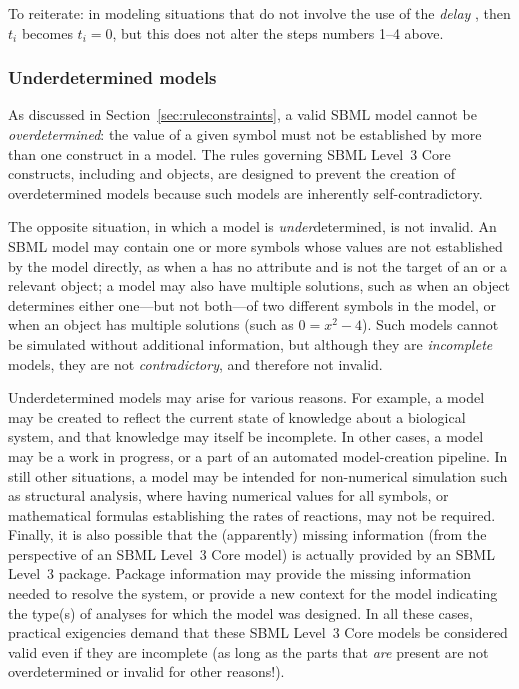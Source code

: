 To reiterate: in modeling situations that do not involve the use
of the \emph{delay} , then $t_i$ becomes $t_i = 0$,
but this does not alter the steps numbers 1--4 above.

\begin{blockChanged}
\subsubsection{Underdetermined models}
\label{sec:underdetermined}

As discussed in Section~\ref{sec:ruleconstraints}, a valid SBML model cannot be \emph{overdetermined}: the value of a given symbol must not be established by more than one construct in a model.  The rules governing SBML Level~3 Core constructs, including \InitialAssignment and \Rule objects, are designed to prevent the creation of overdetermined models because such models are inherently self-contradictory.

The opposite situation, in which a model is \emph{under}determined, is not invalid.  An SBML model may contain one or more symbols whose values are not established by the model directly, as when a \Parameter has no  attribute and is not the target of an \InitialAssignment or a relevant \Rule object; a model may also have multiple solutions, such as when an \AlgebraicRule object determines either one---but not both---of two different symbols in the model, or when an \AlgebraicRule object has multiple solutions (such as $0=x^2-4$).  Such models cannot be simulated without additional information, but although they are \emph{incomplete} models, they are not \emph{contradictory}, and therefore not invalid.

Underdetermined models may arise for various reasons.  For example, a model may be created to reflect the current state of knowledge about a biological system, and that knowledge may itself be incomplete.  In other cases, a model may be a work in progress, or a part of an automated model-creation pipeline.  In still other situations, a model may be intended for non-numerical simulation such as structural analysis, where having numerical values for all symbols, or mathematical formulas establishing the rates of reactions, may not be required.  Finally, it is also possible that the (apparently) missing information (from the perspective of an SBML Level~3 Core model) is actually provided by an SBML Level~3 package.  Package information may provide the missing information needed to resolve the system, or provide a new context for the model indicating the type(s) of analyses for which the model was designed.  In all these cases, practical exigencies demand that these SBML Level~3 Core models be considered valid even if they are incomplete (as long as the parts that \emph{are} present are not overdetermined or invalid for other reasons!).


\end{blockChanged}
